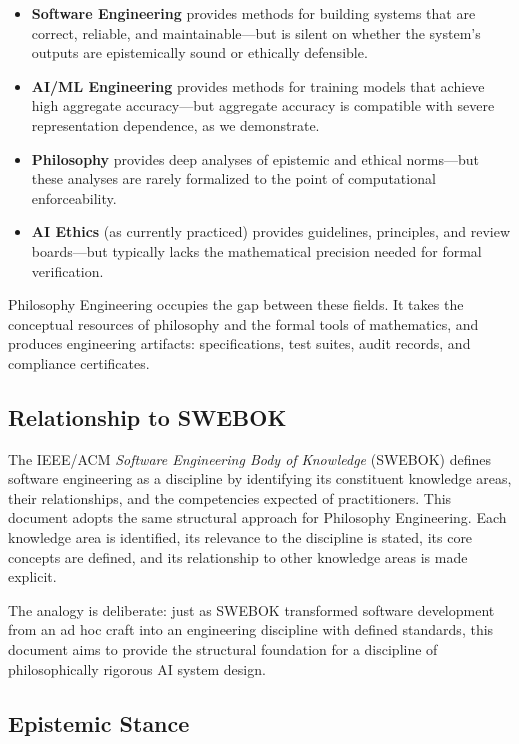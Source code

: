 \documentclass[12pt,letterpaper]{article}
\theoremstyle{definition}
\theoremstyle{plain}
\begin{document}
\begin{itemize}
    \item \textbf{Software Engineering} provides methods for building systems that are correct, reliable, and maintainable---but is silent on whether the system's outputs are epistemically sound or ethically defensible.
    \item \textbf{AI/ML Engineering} provides methods for training models that achieve high aggregate accuracy---but aggregate accuracy is compatible with severe representation dependence, as we demonstrate.
    \item \textbf{Philosophy} provides deep analyses of epistemic and ethical norms---but these analyses are rarely formalized to the point of computational enforceability.
    \item \textbf{AI Ethics} (as currently practiced) provides guidelines, principles, and review boards---but typically lacks the mathematical precision needed for formal verification.
\end{itemize}

Philosophy Engineering occupies the gap between these fields. It takes the conceptual resources of philosophy and the formal tools of mathematics, and produces engineering artifacts: specifications, test suites, audit records, and compliance certificates.

\subsection{Relationship to SWEBOK}

The IEEE/ACM \emph{Software Engineering Body of Knowledge} (SWEBOK) \cite{bourque2014swebok} defines software engineering as a discipline by identifying its constituent knowledge areas, their relationships, and the competencies expected of practitioners. This document adopts the same structural approach for Philosophy Engineering. Each knowledge area is identified, its relevance to the discipline is stated, its core concepts are defined, and its relationship to other knowledge areas is made explicit.

The analogy is deliberate: just as SWEBOK transformed software development from an ad hoc craft into an engineering discipline with defined standards, this document aims to provide the structural foundation for a discipline of philosophically rigorous AI system design.

\subsection{Epistemic Stance}
\end{document}
